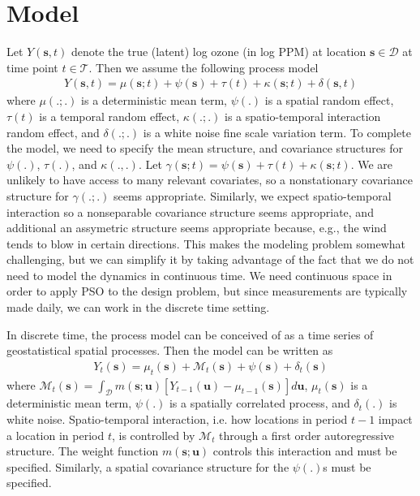 \documentclass[12pt]{article}
\begin{document}
\section{Model}
Let $Y(\bm{s},t)$ denote the true (latent) log ozone (in log PPM) at location $\bm{s}\in \mathcal{D}$ at time point $t\in \mathcal{T}$. Then we assume the following process model
\begin{align*}
Y(\bm{s},t) = \mu(\bm{s};t) + \psi(\bm{s}) + \tau(t) + \kappa(\bm{s};t) + \delta(\bm{s},t)
\end{align*}
where $\mu(.;.)$ is a deterministic mean term, $\psi(.)$ is a spatial random effect, $\tau(t)$ is a temporal random effect, $\kappa(.;.)$ is a spatio-temporal interaction random effect, and $\delta(.;.)$ is a white noise fine scale variation term. To complete the model, we need to specify the mean structure, and covariance structures for $\psi(.)$, $\tau(.)$, and $\kappa(.,.)$. Let $\gamma(\bm{s};t) = \psi(\bm{s}) + \tau(t) + \kappa(\bm{s};t)$. We are unlikely to have access to many relevant covariates, so a nonstationary covariance structure for $\gamma(.;.)$ seems appropriate. Similarly, we expect spatio-temporal interaction so a nonseparable covariance structure seems appropriate, and additional an assymetric structure seems appropriate because, e.g., the wind tends to blow in certain directions. This makes the modeling problem somewhat challenging, but we can simplify it by taking advantage of the fact that we do not need to model the dynamics in continuous time. We need continuous space in order to apply PSO to the design problem, but since measurements are typically made daily, we can work in the discrete time setting. 

In discrete time, the process model can be conceived of as a time series of geostatistical spatial processes. Then the model can be written as
\begin{align*}
Y_t(\bm{s}) = \mu_t(\bm{s}) + \mathcal{M}_t(\bm{s}) + \psi(\bm{s}) + \delta_t(\bm{s})
\end{align*}
where $\mathcal{M}_t(\bm{s}) = \int_{\mathcal{D}}m(\bm{s};\bm{u})[Y_{t-1}(\bm{u}) - \mu_{t-1}(\bm{s})]d\bm{u}$, $\mu_t(\bm{s})$ is a deterministic mean term, $\psi(.)$ is a spatially correlated process, and $\delta_t(.)$ is white noise. Spatio-temporal interaction, i.e. how locations in period $t-1$ impact a location in period $t$, is controlled by $\mathcal{M}_t$ through a first order autoregressive structure. The weight function $m(\bm{s};\bm{u})$ controls this interaction and must be specified. Similarly, a spatial covariance structure for the $\psi(.)$s must be specified.
\end{document}
